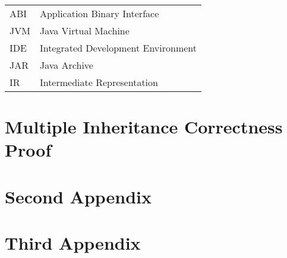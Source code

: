 \documentclass[inscr,ack,preface]{diphdthesis}
\begin{document}

\backmatter


\abbreviations
\begin{center}
	\renewcommand{\arraystretch}{1.5}
	\begin{longtable}{ l @{\qquad} l }
      \toprule
      ABI    & Application Binary Interface \\
      JVM    & Java Virtual Machine \\
      IDE    & Integrated Development Environment \\
      JAR    & Java Archive \\
      IR     & Intermediate Representation \\
      \bottomrule
	\end{longtable}
\end{center}



\begin{appendix}
\appendixstartedtrue

{}

\chapter{Multiple Inheritance Correctness Proof}


\chapter{Second Appendix}
\chapter{Third Appendix}
\end{appendix}



\printbibliography[title={References}]
\end{document}
